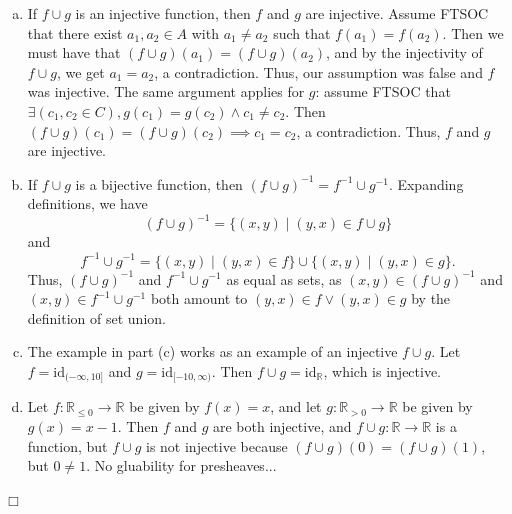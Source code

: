 \documentclass[12pt]{article}
\theoremstyle{definition}
\newenvironment{Solution}{\noindent {\sc Solution.}}{$\Box$ \vspace{2 ex}}
\begin{document}
\begin{Solution}
\begin{enumerate}[(a)]
    \item If $f\cup g$ is an injective function, then $f$ and $g$ are injective. Assume FTSOC that there exist $a_1,a_2 \in A$ with $a_1 \ne a_2$ such that $f(a_1) = f(a_2)$. Then we must have that $(f\cup g)(a_1) = (f\cup g)(a_2)$, and by the injectivity of $f \cup g$, we get $a_1 = a_2$, a contradiction. Thus, our assumption was false and $f$ was injective. The same argument applies for $g$: assume FTSOC that $\exists(c_1,c_2 \in C), g(c_1) =g(c_2) \land c_1 \ne c_2$. Then $(f\cup g)(c_1) = (f\cup g)(c_2) \implies c_1 =c_2$, a contradiction. Thus, $f$ and $g$ are injective.
    \item If $f\cup g$ is a bijective function, then $(f\cup g)^{-1} = f^{-1} \cup g^{-1}$. Expanding definitions, we have \[(f \cup g)^{-1} = \{ (x,y) \mid (y,x) \in f\cup g \}\] and \[f^{-1} \cup g^{-1} = \{(x,y) \mid (y,x) \in f \} \cup \{(x, y)\mid (y,x) \in g \}.\] Thus, $(f\cup g)^{-1}$ and $f^{-1} \cup g^{-1}$ as equal as sets, as $(x,y) \in (f\cup g)^{-1}$ and $(x,y) \in f^{-1} \cup g^{-1}$ both amount to $(y,x) \in f \lor (y,x)\in g$ by the definition of set union.
    \item The example in part (c) works as an example of an injective $f \cup g$. Let $f = \mathrm{id}_{(-\infty,10]}$ and $g = \mathrm{id}_{[-10,\infty)}$. Then $f\cup g =\mathrm{id}_\mathbb{R}$, which is injective.
    \item Let $f : \mathbb{R}_{\le 0} \to \mathbb{R}$ be given by $f(x)=x$, and let $g : \mathbb{R}_{>0} \to \mathbb{R}$ be given by $g(x)=x-1$. Then $f$ and $g$ are both injective, and $f \cup g : \mathbb{R} \to \mathbb{R}$ is a function, but $f \cup g$ is not injective because $(f\cup g)(0) = (f\cup g)(1)$, but $0 \ne 1$. No gluability for presheaves...
\end{enumerate}
\end{Solution}
\end{document}
